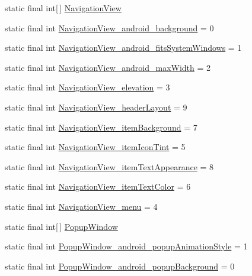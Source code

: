 \begin{CompactItemize}
static final int\mbox{[}$\,$\mbox{]} \hyperlink{classandroid_1_1support_1_1v4_1_1_r_1_1styleable_5278cd545a73a5a4af313995900ae2d8}{NavigationView}
\item 
static final int \hyperlink{classandroid_1_1support_1_1v4_1_1_r_1_1styleable_91a16f1c9df7acfb830e2783aa9b8a8d}{NavigationView\_\-android\_\-background} = 0
\item 
static final int \hyperlink{classandroid_1_1support_1_1v4_1_1_r_1_1styleable_8fef1cdf6a087e5067022f2a52afaf85}{NavigationView\_\-android\_\-fitsSystemWindows} = 1
\item 
static final int \hyperlink{classandroid_1_1support_1_1v4_1_1_r_1_1styleable_10571fdca8781dd2769893b7a2204a50}{NavigationView\_\-android\_\-maxWidth} = 2
\item 
static final int \hyperlink{classandroid_1_1support_1_1v4_1_1_r_1_1styleable_bb75dddc513645cd42bbfa399042cef3}{NavigationView\_\-elevation} = 3
\item 
static final int \hyperlink{classandroid_1_1support_1_1v4_1_1_r_1_1styleable_fe0580320d0eaac865d84f4737141ad0}{NavigationView\_\-headerLayout} = 9
\item 
static final int \hyperlink{classandroid_1_1support_1_1v4_1_1_r_1_1styleable_eab074addccc9ceec10abf5ca55513c9}{NavigationView\_\-itemBackground} = 7
\item 
static final int \hyperlink{classandroid_1_1support_1_1v4_1_1_r_1_1styleable_98d85bc9f9bd29fcdd3e78ac5d8ccafd}{NavigationView\_\-itemIconTint} = 5
\item 
static final int \hyperlink{classandroid_1_1support_1_1v4_1_1_r_1_1styleable_b1a0c348b812e885f19add02ede8941e}{NavigationView\_\-itemTextAppearance} = 8
\item 
static final int \hyperlink{classandroid_1_1support_1_1v4_1_1_r_1_1styleable_a57c40afd9bad59379ce3cb367835803}{NavigationView\_\-itemTextColor} = 6
\item 
static final int \hyperlink{classandroid_1_1support_1_1v4_1_1_r_1_1styleable_6c7bd4b9c988fb62f1fabb28c57b981a}{NavigationView\_\-menu} = 4
\item 
static final int\mbox{[}$\,$\mbox{]} \hyperlink{classandroid_1_1support_1_1v4_1_1_r_1_1styleable_f2e6c1d44ab2f0d74ae025658a5ce5c3}{PopupWindow}
\item 
static final int \hyperlink{classandroid_1_1support_1_1v4_1_1_r_1_1styleable_f970662097b36e68ef64f2f8aac9faa6}{PopupWindow\_\-android\_\-popupAnimationStyle} = 1
\item 
static final int \hyperlink{classandroid_1_1support_1_1v4_1_1_r_1_1styleable_ffd6102b5b5902031d344f853fbe672f}{PopupWindow\_\-android\_\-popupBackground} = 0

\end{CompactItemize}
